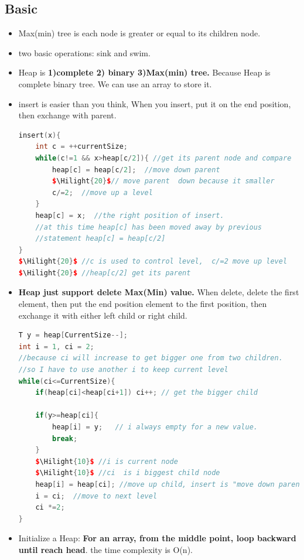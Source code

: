 \documentclass[a4paper,11pt,twoside]{book}
\newcommand{\Hilight}[1]{\makebox[0pt][l]{\color{yellow}\rule[-3pt]{#1em}{11pt}}}
\begin{document}
\subsection{Basic}
\begin{itemize}
\item Max(min) tree is each node is greater or equal to its children node.
\item two basic operations: sink and swim.
\item Heap is \textbf{1)complete 2) binary 3)Max(min) tree.} Because Heap is complete binary tree. We can use an array to store it. 
\item insert is easier than you think, When you insert, put it on the end position, then exchange with parent.  
\begin{lstlisting}[frame=single, language=c++, mathescape=true]
insert(x){
	int c = ++currentSize;
	while(c!=1 && x>heap[c/2]){ //get its parent node and compare
		heap[c] = heap[c/2];  //move down parent
		$\Hilight{20}$// move parent  down because it smaller
		c/=2;  //move up a level 
	}  
	heap[c] = x;  //the right position of insert. 
	//at this time heap[c] has been moved away by previous 
	//statement heap[c] = heap[c/2] 
}
$\Hilight{20}$ //c is used to control level,  c/=2 move up level
$\Hilight{20}$ //heap[c/2] get its parent	
\end{lstlisting}

\item \textbf{Heap just support delete Max(Min) value.} When delete, delete the first element, then put the end position element to the first position, then exchange it with either left child or right child. 
\begin{lstlisting}[frame=single, language=c++, mathescape=true]
T y = heap[CurrentSize--];
int i = 1, ci = 2;
//because ci will increase to get bigger one from two children.
//so I have to use another i to keep current level
while(ci<=CurrentSize){
	if(heap[ci]<heap[ci+1]) ci++; // get the bigger child
	
	if(y>=heap[ci]{
		heap[i] = y;   // i always empty for a new value. 
		break; 
	}
	$\Hilight{10}$ //i is current node
	$\Hilight{10}$ //ci  is i biggest child node
	heap[i] = heap[ci]; //move up child, insert is "move down parent"
	i = ci;  //move to next level
	ci *=2;
}	
\end{lstlisting}



\item Initialize a Heap: \textbf{For an array, from the middle point, loop backward until reach  head}. the time complexity is O(n). 


\end{itemize}
\end{document}
